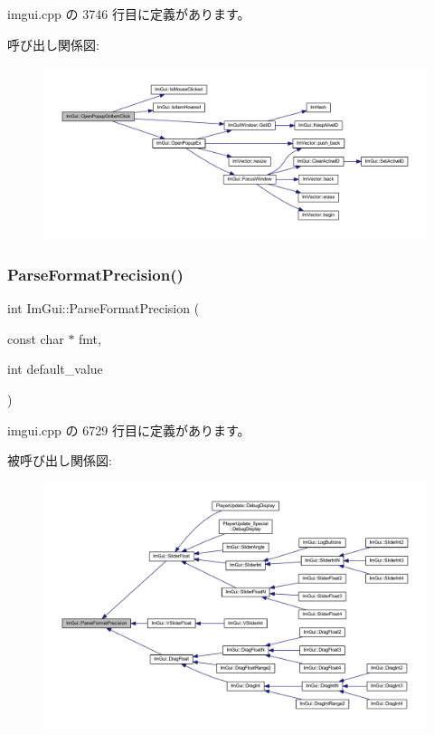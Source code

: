  imgui.\+cpp の 3746 行目に定義があります。

呼び出し関係図\+:\nopagebreak
\begin{figure}[H]
\begin{center}
\leavevmode
\includegraphics[width=350pt]{namespace_im_gui_a546fc46d8f510cb17a2f272891e2f5b3_cgraph}
\end{center}
\end{figure}
\mbox{\label{namespace_im_gui_a40943047a2f8cad978fabffcbd26805f}} 
\subsubsection{\texorpdfstring{Parse\+Format\+Precision()}{ParseFormatPrecision()}}
{\footnotesize\ttfamily int Im\+Gui\+::\+Parse\+Format\+Precision (\begin{DoxyParamCaption}\item[{const char $\ast$}]{fmt,  }\item[{int}]{default\+\_\+value }\end{DoxyParamCaption})}



 imgui.\+cpp の 6729 行目に定義があります。

被呼び出し関係図\+:\nopagebreak
\begin{figure}[H]
\begin{center}
\leavevmode
\includegraphics[width=350pt]{namespace_im_gui_a40943047a2f8cad978fabffcbd26805f_icgraph}
\end{center}
\end{figure}
\mbox{\label{namespace_im_gui_a0a18ae07b294d5667f95a5c003d2efb6}} 
